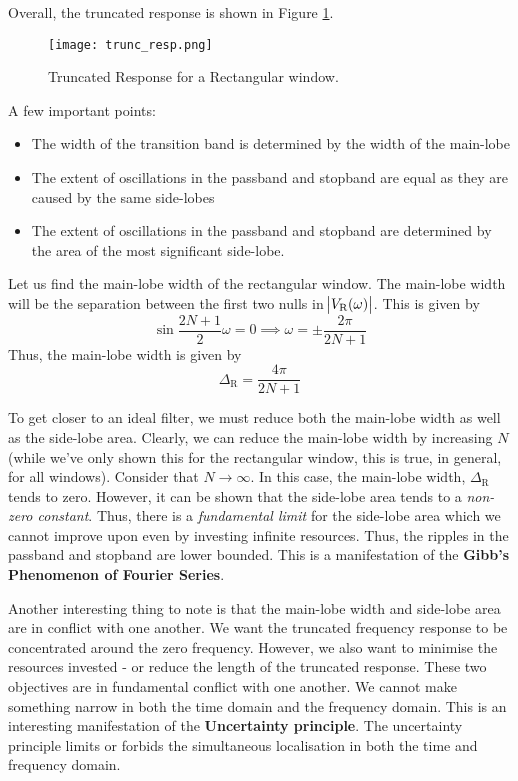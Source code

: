 \documentclass{article}
\theoremstyle{definition}
\begin{document}
Overall, the truncated response is shown in Figure \ref{fig:trunc_resp}. 

\begin{figure}[!h]
    \centering
    \texttt{[image: trunc\_resp.png]}
    \caption{Truncated Response for a Rectangular window.}
    \label{fig:trunc_resp}
\end{figure}

A few important points:

\begin{itemize}
    \item The width of the transition band is determined by the width of the main-lobe
    \item The extent of oscillations in the passband and stopband are equal as they are caused by the same side-lobes
    \item The extent of oscillations in the passband and stopband are determined by the area of the most significant side-lobe.
\end{itemize}

Let us find the main-lobe width of the rectangular window. The main-lobe width will be the separation between the first two nulls in $\abs{V_{\text{R}}(\omega)}$. This is given by 
\[
    \sin \frac{2N + 1}{2} \omega = 0 \implies \omega = \pm \frac{2 \pi}{2N + 1}
\]
Thus, the main-lobe width is given by 
\[
    \Delta_{\text{R}} = \frac{4 \pi}{2N + 1}
\]

To get closer to an ideal filter, we must reduce both the main-lobe width as well as the side-lobe area. Clearly, we can reduce the main-lobe width by increasing $N$ (while we've only shown this for the rectangular window, this is true, in general, for all windows). Consider that $N \rightarrow \infty$. In this case, the main-lobe width, $\Delta_{\text{R}}$ tends to zero. However, it can be shown that the side-lobe area tends to a \textit{non-zero constant}. Thus, there is a \textit{fundamental limit} for the side-lobe area which we cannot improve upon even by investing infinite resources. Thus, the ripples in the passband and stopband are lower bounded. This is a manifestation of the \textbf{Gibb's Phenomenon of Fourier Series}. \medskip

Another interesting thing to note is that the main-lobe width and side-lobe area are in conflict with one another. We want the truncated frequency response to be concentrated around the zero frequency. However, we also want to minimise the resources invested - or reduce the length of the truncated response. These two objectives are in fundamental conflict with one another. We cannot make something narrow in both the time domain and the frequency domain. This is an interesting manifestation of the \textbf{Uncertainty principle}. The uncertainty principle limits or forbids the simultaneous localisation in both the time and frequency domain. \medskip
\end{document}
